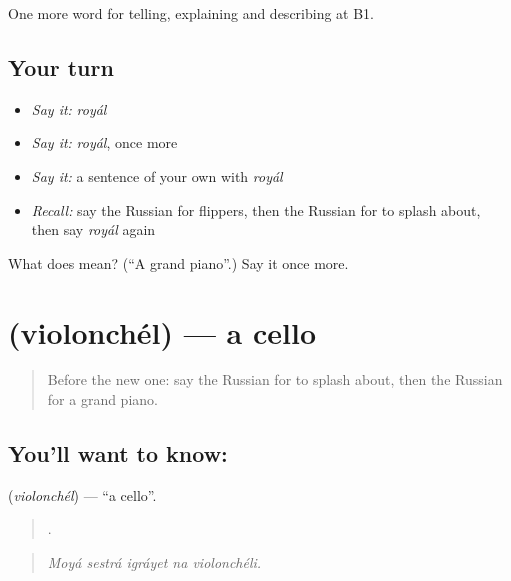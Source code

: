 \begin{grammarlens}[title={What you've built}]
One more word for telling, explaining and describing at B1.
\end{grammarlens}

\subsection*{Your turn}
\begin{itemize}
\raggedright
  \item \emph{Say it:} \emph{royál}
  \item \emph{Say it:} \emph{royál}, once more
  \item \emph{Say it:} a sentence of your own with \emph{royál}
  \item \emph{Recall:} say the Russian for flippers, then the Russian for to splash about, then say \emph{royál} again
\end{itemize}

\begin{tcolorbox}[breakable,colback=teal!4,colframe=teal!35!black,title={Before you move on}]
What does  mean? (\textquotedblleft{}A grand piano\textquotedblright{}.) Say it once more.
\end{tcolorbox}
\section[\texorpdfstring{\ru{виолончель} (violonchél)}{виолончель (violonchél)}]{ (violonchél) — a cello}

\label{lesson:RU-C515-violonchel}



\begin{quote}
Before the new one: say the Russian for to splash about, then the Russian for a grand piano.
\end{quote}

\subsection*{You'll want to know: }
\textbf{} (\emph{violonchél}) — \textquotedblleft{}a cello\textquotedblright{}.

\begin{quote}
    .
\end{quote}

\begin{quote}
\emph{Moyá sestrá igráyet na violonchéli.}
\end{quote}

